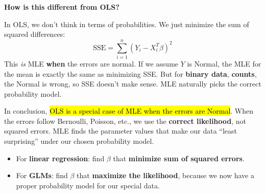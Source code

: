 \highspace
\begin{flushleft}
    \textcolor{Green3}{ \textbf{How is this different from OLS?}}
\end{flushleft}
In OLS, we don't think in terms of probabilities. We just minimize the sum of squared differences:
\begin{equation*}
    \text{SSE} = \sum_{i=1}^n (Y_i - X_i^T \beta)^2
\end{equation*}
This \emph{is} MLE \textbf{when} the errors are normal. If we assume $Y$ is Normal, the MLE for the mean is exactly the same as minimizing SSE. But for \textbf{binary data}, \textbf{counts}, the Normal is wrong, so SSE doesn't make sense. MLE naturally picks the correct probability model.

\highspace
In conclusion, \hl{OLS is a special case of MLE when the errors are Normal}. When the errors follow Bernoulli, Poisson, etc., we use the \textbf{correct likelihood}, not squared errors. MLE finds the parameter values that make our data ``least surprising'' under our chosen probability model.

\highspace
\begin{takeawaysbox}
    \begin{itemize}
        \item For \textbf{linear regression}: find $\beta$ that \textbf{minimize sum of squared errors}.
        \item For \textbf{GLMs}: find $\beta$ that \textbf{maximize the likelihood}, because we now have a proper probability model for our special data.
    \end{itemize}
\end{takeawaysbox}